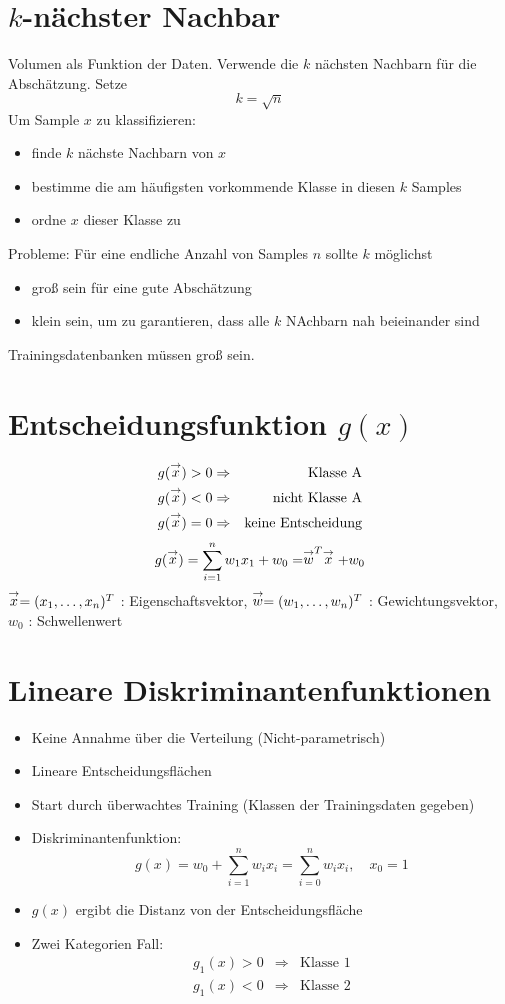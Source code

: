 \section{$k$-nächster Nachbar}

Volumen als Funktion der Daten. Verwende die $k$ nächsten Nachbarn für die Abschätzung. Setze $$k = \sqrt{n}$$ Um Sample $x$ zu klassifizieren:
\begin{itemize}
\item finde $k$ nächste Nachbarn von $x$
\item bestimme die am häufigsten vorkommende Klasse in diesen $k$ Samples
\item ordne $x$ dieser Klasse zu
\end{itemize}
Probleme: Für eine endliche Anzahl von Samples $n$ sollte $k$ möglichst
\begin{itemize}
\item groß sein für eine gute Abschätzung
\item klein sein, um zu garantieren, dass alle $k$ NAchbarn nah beieinander sind
\end{itemize}
Trainingsdatenbanken müssen groß sein.

\section{Entscheidungsfunktion $g(x)$}

\begin{eqnarray*}
g(\stackrel{\to}{x}) > 0 &\Rightarrow& \textrm{Klasse A} \\ g(\stackrel{\to}{x}) < 0 &\Rightarrow& \textrm{nicht Klasse A} \\ g(\stackrel{\to}{x}) = 0 &\Rightarrow& \textrm{keine Entscheidung}
\end{eqnarray*}
$$g(\stackrel{\to}{x}) = \sum\limits_{i=1}^n w_1x_1 + w_0 = \stackrel{\to}{w}^T \stackrel{\to}{x} + w_0$$
$\stackrel{\to}{x} = (x_1,\dots,x_n)^T$ : Eigenschaftsvektor, $\stackrel{\to}{w} = (w_1,\dots,w_n)^T$ : Gewichtungsvektor, $w_0$ : Schwellenwert


\section{Lineare Diskriminantenfunktionen}

\begin{itemize}
\item Keine Annahme über die Verteilung (Nicht-parametrisch)
\item Lineare Entscheidungsflächen
\item Start durch überwachtes Training (Klassen der Trainingsdaten gegeben)
\item Diskriminantenfunktion: $$g(x) = w_0 + \sum\limits_{i=1}^n w_ix_i = \sum\limits_{i=0}^n w_ix_i, \quad x_0 = 1$$
\item $g(x)$ ergibt die Distanz von der Entscheidungsfläche
\item Zwei Kategorien Fall:
\begin{eqnarray*}
g_1(x) > 0 &\Rightarrow& \textrm{Klasse 1} \\ g_1(x) < 0 &\Rightarrow& \textrm{Klasse 2}
\end{eqnarray*}
\end{itemize}

